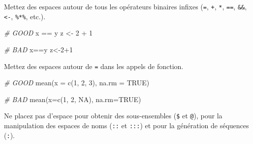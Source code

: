 \documentclass[
  french,
]{scrbook}
\newenvironment{Shaded}{\begin{snugshade}}{\end{snugshade}}
\newcommand{\AttributeTok}[1]{\textcolor[rgb]{0.77,0.63,0.00}{#1}}
\newcommand{\CommentTok}[1]{\textcolor[rgb]{0.56,0.35,0.01}{\textit{#1}}}
\newcommand{\ConstantTok}[1]{\textcolor[rgb]{0.00,0.00,0.00}{#1}}
\newcommand{\DecValTok}[1]{\textcolor[rgb]{0.00,0.00,0.81}{#1}}
\newcommand{\FunctionTok}[1]{\textcolor[rgb]{0.00,0.00,0.00}{#1}}
\newcommand{\NormalTok}[1]{#1}
\newcommand{\OtherTok}[1]{\textcolor[rgb]{0.56,0.35,0.01}{#1}}
\newcommand{\SpecialCharTok}[1]{\textcolor[rgb]{0.00,0.00,0.00}{#1}}
\begin{document}
Mettez des espaces autour de tous les opérateurs binaires infixes (\texttt{=}, \texttt{+}, \texttt{*}, \texttt{==}, \texttt{\&\&}, \texttt{\textless{}-}, \texttt{\%*\%}, etc.).

\begin{Shaded}
\begin{Highlighting}[]
\CommentTok{\# GOOD }
\NormalTok{x }\SpecialCharTok{==}\NormalTok{ y}
\NormalTok{z }\OtherTok{\textless{}{-}} \DecValTok{2} \SpecialCharTok{+} \DecValTok{1}

\CommentTok{\# BAD}
\NormalTok{x}\SpecialCharTok{==}\NormalTok{y}
\NormalTok{z}\OtherTok{\textless{}{-}}\DecValTok{2}\SpecialCharTok{+}\DecValTok{1}
\end{Highlighting}
\end{Shaded}

Mettez des espaces autour de \texttt{=} dans les appels de fonction.

\begin{Shaded}
\begin{Highlighting}[]
\CommentTok{\# GOOD }
\FunctionTok{mean}\NormalTok{(}\AttributeTok{x =} \FunctionTok{c}\NormalTok{(}\DecValTok{1}\NormalTok{, }\DecValTok{2}\NormalTok{, }\DecValTok{3}\NormalTok{), }\AttributeTok{na.rm =} \ConstantTok{TRUE}\NormalTok{)}

\CommentTok{\# BAD}
\FunctionTok{mean}\NormalTok{(}\AttributeTok{x=}\FunctionTok{c}\NormalTok{(}\DecValTok{1}\NormalTok{, }\DecValTok{2}\NormalTok{, }\ConstantTok{NA}\NormalTok{), }\AttributeTok{na.rm=}\ConstantTok{TRUE}\NormalTok{)}
\end{Highlighting}
\end{Shaded}

Ne placez pas d'espace pour obtenir des sous-ensembles (\texttt{\$} et \texttt{@}), pour la manipulation des espaces de noms (\texttt{::} et \texttt{:::}) et pour la génération de séquences (\texttt{:}).

\begin{Shaded}
\end{Shaded}
\end{document}
